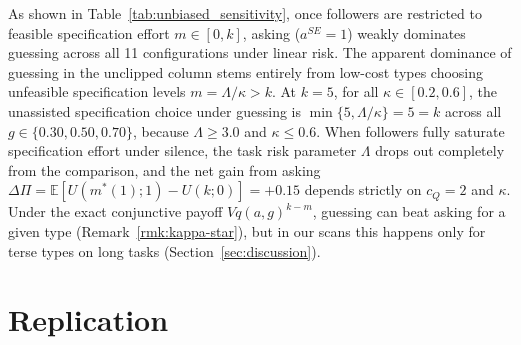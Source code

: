 \documentclass[11pt]{article}
\begin{document}
As shown in Table~\ref{tab:unbiased_sensitivity}, once followers are restricted to feasible specification effort $m \in [0, k]$, asking ($a^{SE} = 1$) weakly dominates guessing across all 11 configurations under linear risk. The apparent dominance of guessing in the unclipped column stems entirely from low-cost types choosing unfeasible specification levels $m = \Lambda/\kappa > k$.
At $k=5$, for all $\kappa \in [0.2, 0.6]$, the unassisted specification choice under guessing is $\min\{5, \Lambda/\kappa\} = 5 = k$ across all $g \in \{0.30, 0.50, 0.70\}$, because $\Lambda \ge 3.0$ and $\kappa \le 0.6$. When followers fully saturate specification effort under silence, the task risk parameter $\Lambda$ drops out completely from the comparison, and the net gain from asking $\Delta\Pi = \mathbb{E}[U(m^*(1); 1) - U(k; 0)] = +0.15$ depends strictly on $c_Q = 2$ and $\kappa$. Under the exact conjunctive payoff $V q(a,g)^{k-m}$, guessing can beat asking for a given type (Remark~\ref{rmk:kappa-star}), but in our scans this happens only for terse types on long tasks (Section~\ref{sec:discussion}).

\section{Replication}
\label{app:replication}
\end{document}
